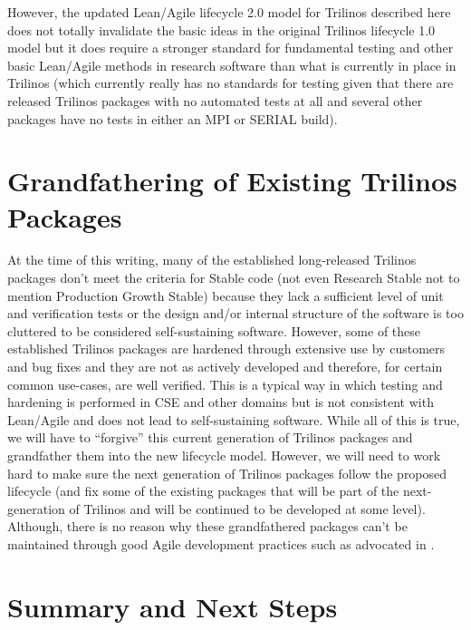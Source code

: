 \documentclass[11pt]{SANDreport}
\begin{document}
However, the updated Lean/Agile lifecycle 2.0 model for Trilinos
described here does not totally invalidate the basic ideas in the
original Trilinos lifecycle 1.0 model but it does require a stronger
standard for fundamental testing and other basic Lean/Agile methods in
research software than what is currently in place in Trilinos (which
currently really has no standards for testing given that there are
released Trilinos packages with no automated tests at all and several
other packages have no tests in either an MPI or SERIAL build).


%
\section{Grandfathering of Existing Trilinos Packages}
\label{sec:grandfathering}
%

At the time of this writing, many of the established long-released
Trilinos packages don't meet the criteria for Stable code (not even
Research Stable not to mention Production Growth Stable) because they
lack a sufficient level of unit and verification tests or the design
and/or internal structure of the software is too cluttered to be
considered self-sustaining software.  However, some of these
established Trilinos packages are hardened through extensive use by
customers and bug fixes and they are not as actively developed and
therefore, for certain common use-cases, are well verified.  This is a
typical way in which testing and hardening is performed in CSE and
other domains but is not consistent with Lean/Agile and does not lead
to self-sustaining software.  While all of this is true, we will have
to ``forgive'' this current generation of Trilinos packages and
grandfather them into the new lifecycle model.  However, we will need
to work hard to make sure the next generation of Trilinos packages
follow the proposed lifecycle (and fix some of the existing packages
that will be part of the next-generation of Trilinos and will be
continued to be developed at some level).  Although, there is no
reason why these grandfathered packages can't be maintained through
good Agile development practices such as advocated in
{}\cite{WorkingEffectivelyWithLegacyCode05}.


%
{}\section{Summary and Next Steps}
\label{sec:summary_next_steps}
%
\end{document}
